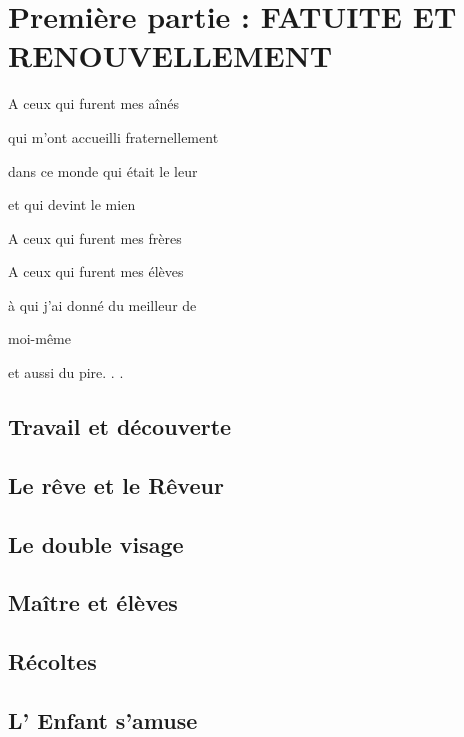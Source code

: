 \part{Première partie : FATUITE ET RENOUVELLEMENT}

\newpage

\begin{center}
    A ceux qui furent mes aînés
    
    qui m’ont accueilli fraternellement  
    
    dans ce monde qui était le leur  
    
    et qui devint le mien

    \vspace{1cm}

    A ceux qui furent mes frères
    
    A ceux qui furent mes élèves  
    
    à qui j’ai donné du meilleur de  
    
    moi-même  
    
    et aussi du pire. . .
\end{center}

\newpage

\chapter{Travail et découverte}




\chapter{Le rêve et le Rêveur}











\chapter{Le double visage}









\chapter{Maître et élèves}








\chapter{Récoltes}









\chapter{L' Enfant s'amuse}





